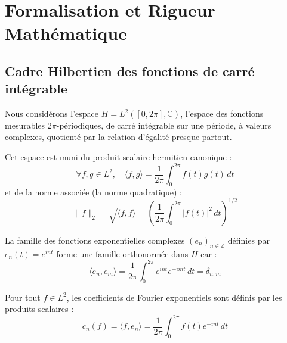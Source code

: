 \documentclass[11pt,a4paper]{article}
\begin{document}
\begin{center}
\end{center}

\section{Formalisation et Rigueur Mathématique}


\subsection{Cadre Hilbertien des fonctions de carré intégrable}


Nous considérons l'espace $H = L^2([0, 2\pi], \mathbb{C})$, l'espace des fonctions mesurables $2\pi$-périodiques, de carré intégrable sur une période, à valeurs complexes, quotienté par la relation d'égalité presque partout.

Cet espace est muni du produit scalaire hermitien canonique :
$$\forall f, g \in L^2, \quad \langle f, g \rangle = \frac{1}{2\pi} \int_0^{2\pi} f(t) \overline{g(t)} \, dt$$
et de la norme associée (la norme quadratique) :
$$\|f\|_2 = \sqrt{\langle f, f \rangle} = \left( \frac{1}{2\pi} \int_0^{2\pi} |f(t)|^2 \, dt \right)^{1/2}$$

La famille des fonctions exponentielles complexes $(e_n)_{n \in \mathbb{Z}}$ définies par $e_n(t) = e^{int}$ forme une famille orthonormée dans $H$ car :
$$\langle e_n, e_m \rangle = \frac{1}{2\pi} \int_0^{2\pi} e^{int} e^{-imt} \, dt = \delta_{n,m}$$

Pour tout $f \in L^2$, les coefficients de Fourier exponentiels sont définis par les produits scalaires :
$$c_n(f) = \langle f, e_n \rangle = \frac{1}{2\pi} \int_0^{2\pi} f(t) e^{-int} \, dt$$
\end{document}
